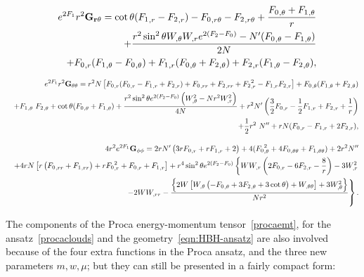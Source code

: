\begin{eqnarray}
 && e^{2F_1}r^2{\bf G_{r\theta}}=
\cot\theta (
{F_1}_{,r} -{F_2}_{,r} )-{F_0}_{,r\theta}-{F_2}_{,r\theta}+\frac{{F_0}_{,\theta}+{F_1}_{,\theta}}{r}\nonumber \\ 
&&+\frac{r^2 \sin ^2\theta 
W_{,\theta} W_{,r} e^{2( {F_2}- {F_0})}-N'( {F_0}_{,\theta}-{F_1}_{,\theta})}{2 
N} \nonumber \\ 
&& + {F_0}_{,r} ({F_1}_{,\theta}-{F_0}_{,\theta})+
{F_1}_{,r}({F_0}_{,\theta}+{F_2}_{,\theta} )+{F_2}_{,r}( {F_1}_{,\theta}- {F_2}_{,\theta} ),
\end{eqnarray}




\begin{eqnarray}
&&  e^{2F_1}r^2{\bf G_{\theta\theta}}=r^2 N\left[ {F_0}_{,r}({F_0}_{,r}- 
{F_1}_{,r}+{F_2}_{,r}) + {F_0}_{,rr}+
{F_2}_{,rr}+ {F_2}_{,r}^2-{F_1}_{,r} {F_2}_{,r} \right]
%
+{F_0}_{,\theta}( {F_1}_{,\theta}+ 
{F_2}_{,\theta})
%
 \nonumber \\
&&
+{F_1}_{,\theta} \
{F_2}_{,\theta}
+\cot \theta( {F_0}_{,\theta}+ {F_1}_{,\theta})+\frac{r^2 \sin ^2\theta 
 e^{2( {F_2}- {F_0})}\left(W_{,\theta}^2-Nr^2  W_{,r}^2\right)}{4 N}+r^2 N' \left(\frac{3}{2} {F_0}_{,r}-\frac{1}{2}  {F_1}_{,r}+
{F_2}_{,r}+\frac{1}{r}\right)
 \nonumber \\
&&
+\frac{1}{2} r^2 \
N''
+r N(
{F_0}_{,r}-
{F_1}_{,r}+2 {F_2}_{,r}),
\end{eqnarray}



\begin{eqnarray}
&& 4r^2e^{2F_1}{\bf G_{\phi\phi}}= 2 r N'  \left(3 r {F_0}_{,r}+r 
{F_1}_{,r}+2\right)+4 (
{F_0}_{,\theta}^2  +4{F_0}_{,\theta\theta}+ {F_1}_{,\theta\theta}) +2 r^2 N''  \nonumber \\
%
&& 
%
+4 r N  \left[r \left({F_0}_{,rr}+{F_1}_{,rr}\right)+r 
{F_0}_{,r}^2+{F_0}_{,r}+{F_1}_{,r}\right] +r^4 \sin ^2\theta e^{2 ({F_2}-F_0)}\left\{ W W_{,r}\left(2  {F_0}_{,r}-6 {F_2}_{,r}-\frac{8}{r}\right)-3  W_{,r}^2\right. \nonumber \\
%
&&
\left.-2 WW_{,rr}- \frac{\left\{2 W \left[W_{,\theta} \left(- {F_0}_{,\theta}
+3 {F_2}_{,\theta}+3 \cot \theta\right)+ W_{,\theta\theta}\right]+3 W_{,\theta}^2\right\}}{Nr^2}\right\} .
\end{eqnarray}






The components of the Proca energy-momentum tensor~\eqref{procaemt}, for the ansatz~\eqref{procaclouds} and the geometry~\eqref{eqn:HBH-ansatz} are also involved because of the four extra functions in the Proca ansatz, and the three new parameters $m,w,\mu$; but they can still be presented in a fairly compact form:

